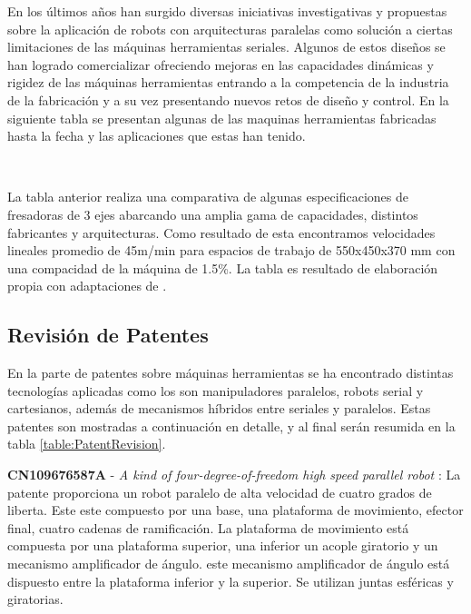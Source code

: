 
En los últimos años han surgido diversas iniciativas investigativas y propuestas sobre la aplicación de robots con arquitecturas paralelas como solución a ciertas limitaciones de las máquinas herramientas seriales. Algunos de estos diseños se han logrado comercializar ofreciendo mejoras en las capacidades dinámicas y rigidez de las máquinas herramientas entrando a la competencia de la industria de la fabricación y a su vez presentando nuevos retos de diseño y control. En la siguiente tabla se presentan algunas de las maquinas herramientas fabricadas hasta la fecha y las aplicaciones que estas han tenido.

~


La tabla anterior realiza una comparativa de algunas especificaciones de fresadoras de 3 ejes abarcando una amplia gama de capacidades, distintos fabricantes y arquitecturas. Como resultado de esta encontramos velocidades lineales promedio de 45m/min para espacios de trabajo de 550x450x370 mm con una compacidad de la máquina de 1.5\%. La tabla es resultado de elaboración propia con adaptaciones de \cite{serje2017parallel}.



\subsection{Revisión de Patentes}
En la parte de patentes sobre máquinas herramientas se ha encontrado distintas tecnologías aplicadas como los son manipuladores paralelos, robots serial y cartesianos, además de mecanismos híbridos entre seriales y paralelos. Estas patentes son mostradas a continuación en detalle, y al final serán resumida en la tabla \ref{table:PatentRevision}.

\textbf{CN109676587A} - \textit{A kind of four-degree-of-freedom high speed parallel robot} \citep{patent:CN109676587A}: La patente proporciona un robot paralelo de alta velocidad de cuatro grados de liberta. Este este compuesto por una base, una plataforma de movimiento, efector final, cuatro cadenas de ramificación. La plataforma de movimiento está compuesta por una plataforma superior, una inferior un acople giratorio y un mecanismo amplificador de ángulo. este mecanismo amplificador de ángulo está dispuesto entre la plataforma inferior y la superior. Se utilizan juntas esféricas y giratorias.

